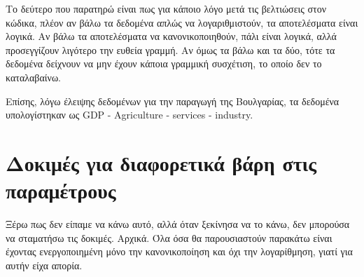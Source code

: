 \documentclass[a4paper,twoside,10pt]{article}
\begin{document}
	Το δεύτερο που παρατηρώ είναι πως για κάποιο λόγο μετά τις βελτιώσεις στον κώδικα, πλέον αν βάλω τα δεδομένα απλώς να λογαριθμιστούν, τα αποτελέσματα είναι λογικά. Αν βάλω τα αποτελέσματα να κανονικοποιηθούν, πάλι είναι λογικά, αλλά προσεγγίζουν λιγότερο την ευθεία γραμμή. Αν όμως τα βάλω και τα δύο, τότε τα δεδομένα δείχνουν να μην έχουν κάποια γραμμική συσχέτιση, το οποίο δεν το καταλαβαίνω. 
	
	Επίσης, λόγω έλειψης δεδομένων για την παραγωγή της Βουλγαρίας, τα δεδομένα υπολογίστηκαν ως GDP - Agriculture - services - industry.
	
	\section{Δοκιμές για διαφορετικά βάρη στις παραμέτρους}
	Ξέρω πως δεν είπαμε να κάνω αυτό, αλλά όταν ξεκίνησα να το κάνω, δεν μπορούσα να σταματήσω τις δοκιμές. Αρχικά. Όλα όσα θα παρουσιαστούν παρακάτω είναι έχοντας ενεργοποιημένη μόνο την κανονικοποίηση και όχι την λογαρίθμηση, γιατί για αυτήν είχα απορία. 
	
\end{document}
